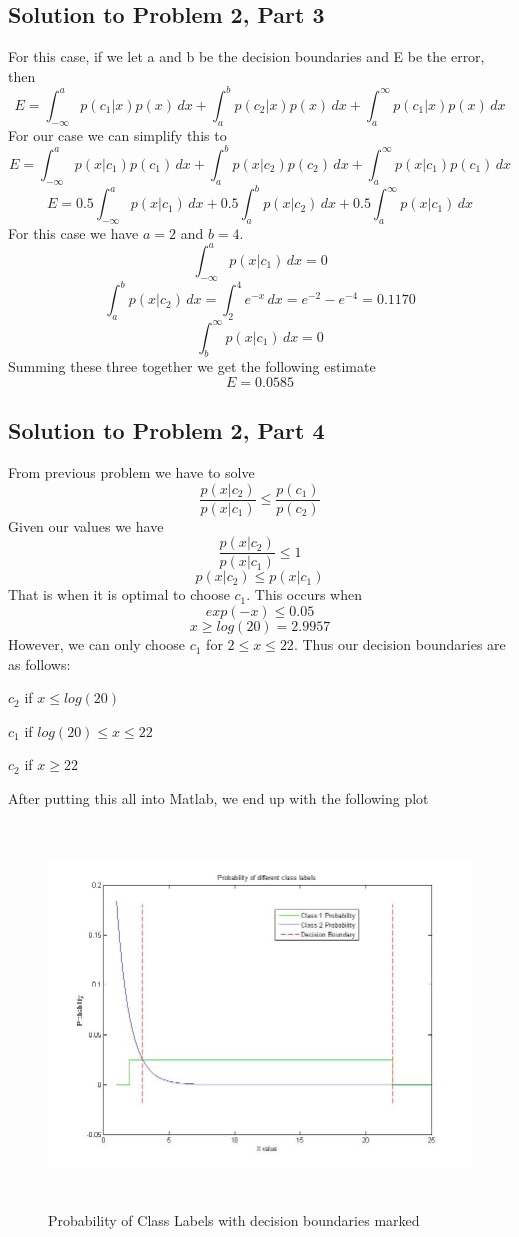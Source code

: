 \documentclass[11pt,psfig]{article}
\begin{document}
\subsection*{Solution to Problem 2, Part 3}

For this case, if we let a and b be the decision boundaries and E be the error, then
\[
E = \int_{-\infty}^{a}{p(c_1|x)p(x) \, dx} + \int_{a}^{b}{p(c_2|x)p(x) \, dx} + \int_{a}^{\infty}{p(c_1|x)p(x) \, dx}
\]
For our case we can simplify this to
\[
E = \int_{-\infty}^{a}{p(x|c_1)p(c_1) \, dx} + \int_{a}^{b}{p(x|c_2)p(c_2) \, dx} + \int_{a}^{\infty}{p(x|c_1)p(c_1) \, dx}
\]
\[
E = 0.5\int_{-\infty}^{a}{p(x|c_1) \, dx} + 0.5\int_{a}^{b}{p(x|c_2) \, dx} + 0.5\int_{a}^{\infty}{p(x|c_1) \, dx}
\]
For this case we have $a=2$ and $b=4$. \\
\[
\int_{-\infty}^{a}{p(x|c_1) \, dx} = 0
\]
\[
\int_{a}^{b}{p(x|c_2) \, dx} = \int_{2}^{4}{e^{-x} \, dx} = e^{-2} - e^{-4} = 0.1170
\]
\[
\int_{b}^{\infty}{p(x|c_1) \, dx} = 0
\]
Summing these three together we get the following estimate
\[
E = 0.0585
\]

\subsection*{Solution to Problem 2, Part 4}

From previous problem we have to solve
\[
\frac{p(x|c_2)}{p(x|c_1)} \leq \frac{p(c_1)}{p(c_2)}
\]
Given our values we have
\[
\frac{p(x|c_2)}{p(x|c_1)} \leq 1
\]
\[
p(x|c_2) \leq p(x|c_1)
\]
That is when it is optimal to choose $c_1$. This occurs when
\[
exp(-x) \leq 0.05
\]
\[
x \geq log(20) = 2.9957
\]
However, we can only choose $c_1$ for $2 \leq x \leq 22$. Thus our decision boundaries are as follows: 

$c_2$ if $x \leq log(20)$

$c_1$ if $log(20) \leq x \leq 22$

$c_2$ if $x \geq 22$

After putting this all into Matlab, we end up with the following plot
\begin{figure}[H]
\centering
\includegraphics[height=4in]{prob2part2plot.jpg}
\caption{Probability of Class Labels with decision boundaries marked}
\end{figure}
\end{document}
